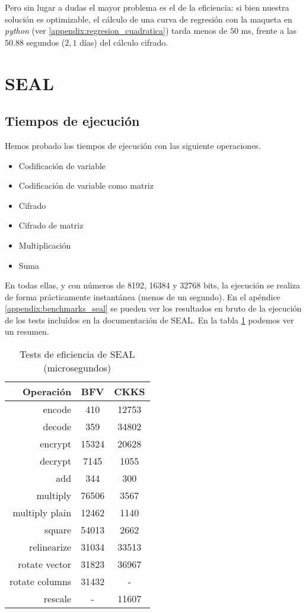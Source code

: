 Pero sin lugar a dudas el mayor problema es el de la eficiencia: si bien nuestra solución es optimizable, el cálculo de una curva de regresión con la maqueta en \textit{python} (ver \ref{appendix:regresion_cuadratica}) tarda menos de $50$ ms, frente a las $50.88$ segundos ($2,1$ días) del cálculo cifrado.

\section{SEAL}

\subsection{Tiempos de ejecución}

Hemos probado los tiempos de ejecución con las siguiente operaciones.

\begin{itemize}
    \item Codificación de variable
    \item Codificación de variable como matriz
    \item Cifrado
    \item Cifrado de matriz
    \item Multiplicación
    \item Suma
\end{itemize}

En todas ellas, y con números de 8192, 16384 y 32768 bits, la ejecución se realiza de forma prácticamente instantánea (menos de un segundo). En el apéndice \ref{appendix:benchmarks_seal} se pueden ver los resultados en bruto de la ejecución de los tests incluídos en la documentación de SEAL. En la tabla \ref{table:benchmarks_seal} podemos ver un resumen.

\begin{table}[]
    \centering
    \begin{tabular}{r | c c}
        Operación   & BFV & CKKS  \\
        \hline \hline
        encode  & 410  & 12753 \\
        decode  & 359  & 34802 \\
        encrypt & 15324 & 20628 \\
        decrypt & 7145  & 1055 \\
        add & 344 & 300 \\
        multiply  & 76506  & 3567 \\
        multiply plain  & 12462  & 1140 \\
        square  & 54013  & 2662 \\
        relinearize & 31034 & 33513 \\
        rotate vector  & 31823  & 36967 \\
        rotate columns  & 31432  & - \\
        rescale  & - & 11607
    \end{tabular}
    \caption{Tests de eficiencia de SEAL (microsegundos)}
    \label{table:benchmarks_seal}
\end{table}

